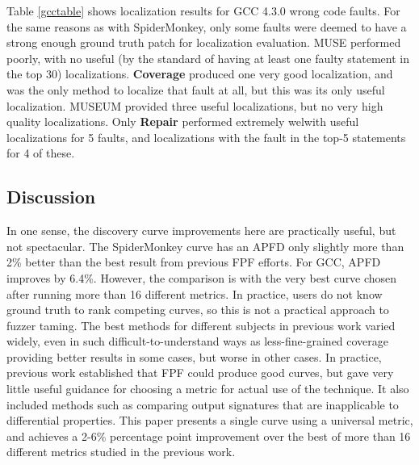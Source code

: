 Table \ref{gcctable} shows localization results for GCC 4.3.0 wrong code faults.  For the same reasons as with SpiderMonkey, only some faults were deemed to have a strong enough ground truth patch for localization evaluation.   MUSE performed poorly, with no useful (by the standard of having at least one faulty statement in the top 30) localizations.  {\bf Coverage} produced one very good localization, and was the only method to localize that fault at all, but this was its only useful localization.  MUSEUM provided three useful localizations, but no very high quality localizations.  Only {\bf Repair} performed extremely welwith useful localizations for 5 faults, and localizations with the fault in the top-5 statements for 4 of these.

\subsection{Discussion}

In one sense, the discovery curve improvements here are practically useful, but not spectacular.  The SpiderMonkey curve has an APFD only slightly more than 2\% better than the best result from previous FPF efforts.  For GCC, APFD improves by 6.4\%.  However, the comparison is with the very best curve chosen after running more than 16 different metrics.  In practice, users do not know ground truth to rank competing curves, so this is not a practical approach to fuzzer taming.  The best methods for different subjects in previous work varied widely, even in such difficult-to-understand ways as less-fine-grained coverage providing better results in some cases, but worse in other cases.   In practice, previous work established that FPF could produce good curves, but gave very little useful guidance for choosing a metric for actual use of the technique.  It also included methods such as comparing output signatures that are inapplicable to differential properties.  This paper presents a single curve using a universal metric, and achieves a 2-6\% percentage point improvement over the best of more than 16 different metrics studied in the previous work.

